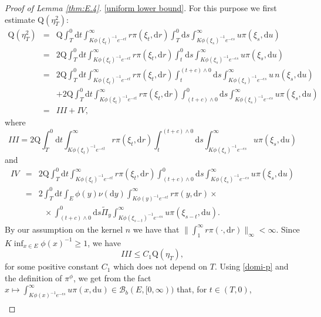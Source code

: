 \documentclass[12pt,a4paper]{amsart}
\numberwithin{equation}{section}
\theoremstyle{plain}
\theoremstyle{definition}
\theoremstyle{remark}
\begin{document}
\begin{proof}[Proof of Lemma \ref{thm:E.4}]
 \eqref{uniform lower bound}. For this purpose we first estimate
$\mathrm Q(\eta_T^2)$:
\begin{eqnarray*}
\mathrm Q(\eta_T^2)&=&\mathrm Q\int_T^0\mathrm dt\int_{K\phi(\xi_t)^{-1}e^{-\epsilon t}}^\infty r \pi(\xi_t, \mathrm dr)\int_T^0\mathrm ds\int_{K\phi(\xi_s)^{-1}e^{-\epsilon s}}^\infty u \pi(\xi_s, \mathrm du)\\
&=&2\mathrm Q\int_T^0\mathrm dt\int_{K\phi(\xi_t)^{-1} e^{-\epsilon t}}^\infty r \pi(\xi_t, \mathrm dr)\int_t^0\mathrm ds
\int_{K\phi(\xi_s)^{-1}e^{-\epsilon s}}^\infty u \pi(\xi_s, \mathrm du)\\
&=&2\mathrm Q\int_T^0\mathrm dt\int_{K\phi(\xi_t)^{-1}e^{-\epsilon t}}^\infty r \pi(\xi_t, \mathrm dr)
\int_t^{(t+c)\wedge 0}\mathrm ds\int_{K\phi(\xi_s)^{-1}e^{-\epsilon s}}^\infty u\, n(\xi_s, \mathrm du)\\
&&+2\mathrm Q\int_T^{0}\mathrm dt\int_{K \phi(\xi_t)^{-1}e^{-\epsilon t}}^\infty r \pi(\xi_t, \mathrm dr)
\int_{(t+c)\wedge 0}^0\mathrm ds\int_{K\phi(\xi_s)^{-1}e^{-\epsilon s}}^\infty u \pi(\xi_s, \mathrm du)\\
&=&III+IV,
\end{eqnarray*}
where
$$
III=\displaystyle 2\mathrm Q\int_T^0\mathrm dt\int_{K\phi(\xi_t)^{-1} e^{-\epsilon t}}^\infty r \pi(\xi_t, \mathrm dr)\int_t^{(t+c)\wedge 0}\mathrm ds\int_{K\phi(
\xi_s)^{-1}e^{-\epsilon s}}^\infty u \pi(\xi_s,\mathrm du)
$$
and
\begin{eqnarray*}
IV& =& 2\mathrm Q\int_T^0\mathrm dt \int_{K\phi(\xi_t)^{-1}e^{-\epsilon t}}^\infty r \pi(\xi_t, \mathrm dr)
\int_{(t+c)\wedge 0}^0\mathrm ds\int_{K\phi(\xi_s)^{-1}e^{-\epsilon s}}^\infty u \pi(\xi_s, \mathrm du)\\
&=& 2\int_T^0\mathrm dt\int_E\phi(y)\nu(\mathrm dy)\int_{K\phi(y)^{-1}e^{-\epsilon t}}^\infty r \pi(y, \mathrm dr)\times\\
&& \ \ \ \times \int_{(t+c)\wedge 0}^0\mathrm ds\widetilde\Pi_y\int_{K\phi(\xi_{s-t})^{-1}e^{-\epsilon s}}^\infty u \pi(\xi_{s-t},\mathrm du).
\end{eqnarray*}
By our assumption on the kernel $n$ we have that $ \|\int_1^\infty r\pi(\cdot,\mathrm dr)\|_{\infty}<\infty$. Since $K\inf_{x\in
E}\phi(x)^{-1}\ge 1$,  we have
$$
III\leq C_1 \mathrm Q(\eta_T),
$$
for some positive constant $ C_1$ which does not depend on $T$.
Using \eqref{domi-p} and the definition of $\pi^{\phi}$, we get from the fact $x\longmapsto\int_{K\phi(x)^{-1}e^{-\epsilon s}}^\infty u \pi(x,\mathrm du)\in\mathcal B_b(E,[0,\infty))$ that, for $t\in(T, 0)$,
$$
\begin{array}{rl}

\end{array}$$
\end{proof}
\end{document}
